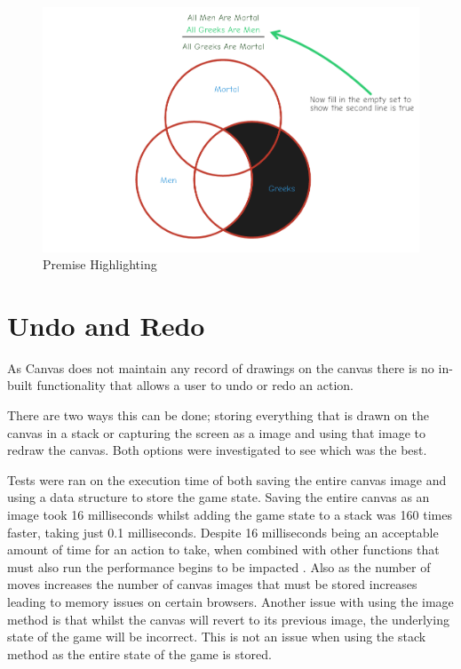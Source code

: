 \documentclass[12pt,a4paper]{report}
\begin{document}
\begin{figure}[h]
\centering
    \includegraphics[scale=0.5]{PremiseHighlight}
    \caption{Premise Highlighting}
    \label{fig:floodFillBad}
\end{figure}
\FloatBarrier



\section{Undo and Redo}
As Canvas does not maintain any record of drawings on the canvas there is no in-built functionality that allows a user to undo or redo an action. 

There are two ways this can be done; storing everything that is drawn on the canvas in a stack or capturing the screen as a image and using that image to redraw the canvas. Both options were investigated to see which was the best.

Tests were ran on the execution time of both saving the entire canvas image and using a data structure to store the game state. Saving the entire canvas as an image took 16 milliseconds whilst adding the game state to a stack was 160 times faster, taking just 0.1 milliseconds. Despite 16 milliseconds being an acceptable amount of time for an action to take, when combined with other functions that must also run the performance begins to be impacted . Also as the number of moves increases the number of canvas images that must be stored increases leading to memory issues on certain browsers. Another issue with using the image method is that whilst the canvas will revert to its previous image, the underlying state of the game will be incorrect. This is not an issue when using the stack method as the entire state of the game is stored.
\end{document}
